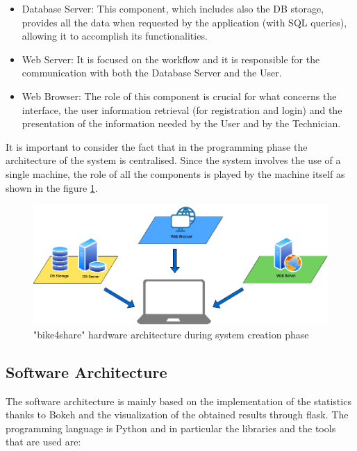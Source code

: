 \documentclass{article}
\begin{document}
\begin{itemize}
    \item Database Server: This component, which includes also the DB storage, provides all the data when requested by the application (with SQL queries), allowing it to accomplish its functionalities.
    \item Web Server: It is focused on the workflow and it is responsible for the communication with both the Database Server and the User.
    \item Web Browser: The role of this component is crucial for what concerns the interface, the user information retrieval (for registration and login) and the presentation of the information needed by the User and by the Technician. 
\end{itemize}
It is important to consider the fact that in the programming phase the architecture of the system is centralised. Since the system involves the use of a single machine, the role of all the components is played by the machine itself as shown in the figure \ref{fig:com_createSchema}.\\
\begin{figure}[H]
    \centering
    \includegraphics[width=0.85\linewidth]{image/hardware_architecture.png}
    \caption{"bike4share" hardware architecture during system creation phase}
    \label{fig:com_createSchema}
\end{figure}

\subsection{Software Architecture}
The software architecture is mainly based on the implementation of the statistics thanks to Bokeh and the visualization of the obtained results through flask.
The programming language is Python and in particular the libraries and the tools that are used are:
\end{document}

